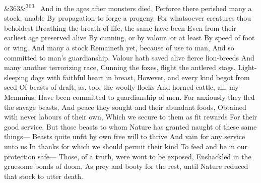 \documentclass[12pt]{article}
\newcommand{\para}[1][]{\par\noindent\ifx&#1&\else\textsuperscript{\footnotesize #1}~\fi}
\begin{document}
\para[363] And in the ages after monsters died, Perforce there perished many a stock, unable By propagation to forge a progeny. For whatsoever creatures thou beholdest Breathing the breath of life, the same have been Even from their earliest age preserved alive By cunning, or by valour, or at least By speed of foot or wing. And many a stock Remaineth yet, because of use to man, And so committed to man's guardianship. Valour hath saved alive fierce lion-breeds And many another terrorizing race, Cunning the foxes, flight the antlered stags. Light-sleeping dogs with faithful heart in breast, However, and every kind begot from seed Of beasts of draft, as, too, the woolly flocks And horned cattle, all, my Memmius, Have been committed to guardianship of men. For anxiously they fled the savage beasts, And peace they sought and their abundant foods, Obtained with never labours of their own, Which we secure to them as fit rewards For their good service. But those beasts to whom Nature has granted naught of these same things--- Beasts quite unfit by own free will to thrive And vain for any service unto us In thanks for which we should permit their kind To feed and be in our protection safe--- Those, of a truth, were wont to be exposed, Enshackled in the gruesome bonds of doom, As prey and booty for the rest, until Nature reduced that stock to utter death.
\end{document}

